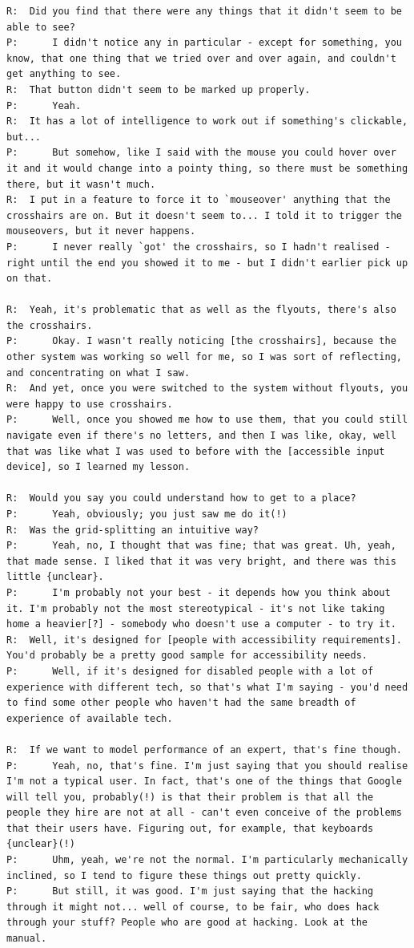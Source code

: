 \documentclass[11pt,openright,a4paper]{report}
\begin{document}
\begin{lstlisting}[caption={Transcript of Usability Study}, label={lst:usabilityTrans}, style=basic, language=custom, flexiblecolumns=true]
R:	Did you find that there were any things that it didn't seem to be able to see?
P:		I didn't notice any in particular - except for something, you know, that one thing that we tried over and over again, and couldn't get anything to see.
R:	That button didn't seem to be marked up properly.
P:		Yeah.
R:	It has a lot of intelligence to work out if something's clickable, but...
P:		But somehow, like I said with the mouse you could hover over it and it would change into a pointy thing, so there must be something there, but it wasn't much.
R:	I put in a feature to force it to `mouseover' anything that the crosshairs are on. But it doesn't seem to... I told it to trigger the mouseovers, but it never happens.
P:		I never really `got' the crosshairs, so I hadn't realised - right until the end you showed it to me - but I didn't earlier pick up on that.

R:	Yeah, it's problematic that as well as the flyouts, there's also the crosshairs.
P:		Okay. I wasn't really noticing [the crosshairs], because the other system was working so well for me, so I was sort of reflecting, and concentrating on what I saw.
R:	And yet, once you were switched to the system without flyouts, you were happy to use crosshairs.
P:		Well, once you showed me how to use them, that you could still navigate even if there's no letters, and then I was like, okay, well that was like what I was used to before with the [accessible input device], so I learned my lesson.

R:	Would you say you could understand how to get to a place?
P:		Yeah, obviously; you just saw me do it(!)
R:	Was the grid-splitting an intuitive way?
P:		Yeah, no, I thought that was fine; that was great. Uh, yeah, that made sense. I liked that it was very bright, and there was this little {unclear}.
P:		I'm probably not your best - it depends how you think about it. I'm probably not the most stereotypical - it's not like taking home a heavier[?] - somebody who doesn't use a computer - to try it.
R:	Well, it's designed for [people with accessibility requirements]. You'd probably be a pretty good sample for accessibility needs.
P:		Well, if it's designed for disabled people with a lot of experience with different tech, so that's what I'm saying - you'd need to find some other people who haven't had the same breadth of experience of available tech.

R:	If we want to model performance of an expert, that's fine though.
P:		Yeah, no, that's fine. I'm just saying that you should realise I'm not a typical user. In fact, that's one of the things that Google will tell you, probably(!) is that their problem is that all the people they hire are not at all - can't even conceive of the problems that their users have. Figuring out, for example, that keyboards {unclear}(!)
P:		Uhm, yeah, we're not the normal. I'm particularly mechanically inclined, so I tend to figure these things out pretty quickly.
P:		But still, it was good. I'm just saying that the hacking through it might not... well of course, to be fair, who does hack through your stuff? People who are good at hacking. Look at the manual.


\end{lstlisting}
\end{document}
